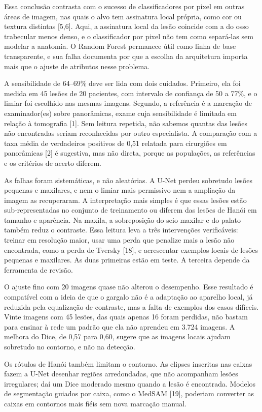 \documentclass[twocolumn]{article}
\begin{document}
Essa conclusão contrasta com o sucesso de classificadores por pixel em outras áreas de imagem, nas quais o alvo tem assinatura local própria, como cor ou textura distintas [5,6]. Aqui, a assinatura local da lesão coincide com a do osso trabecular menos denso, e o classificador por pixel não tem como separá-las sem modelar a anatomia. O Random Forest permanece útil como linha de base transparente, e sua falha documenta por que a escolha da arquitetura importa mais que o ajuste de atributos nesse problema.

A sensibilidade de 64--69\% deve ser lida com dois cuidados. Primeiro, ela foi medida em 45 lesões de 20 pacientes, com intervalo de confiança de 50 a 77\%, e o limiar foi escolhido nas mesmas imagens. Segundo, a referência é a marcação de  examinador(es) sobre panorâmicas, exame cuja sensibilidade é limitada em relação à tomografia [1]. Sem leitura repetida, não sabemos quantas das lesões não encontradas seriam reconhecidas por outro especialista. A comparação com a taxa média de verdadeiros positivos de 0,51 relatada para cirurgiões em panorâmicas [2] é sugestiva, mas não direta, porque as populações, as referências e os critérios de acerto diferem.

As falhas foram sistemáticas, e não aleatórias. A U-Net perdeu sobretudo lesões pequenas e maxilares, e nem o limiar mais permissivo nem a ampliação da imagem as recuperaram. A interpretação mais simples é que essas lesões estão sub-representadas no conjunto de treinamento ou diferem das lesões de Hanói em tamanho e aparência. Na maxila, a sobreposição do seio maxilar e do palato também reduz o contraste. Essa leitura leva a três intervenções verificáveis: treinar em resolução maior, usar uma perda que penalize mais a lesão não encontrada, como a perda de Tversky [18], e acrescentar exemplos locais de lesões pequenas e maxilares. As duas primeiras estão em teste. A terceira depende da ferramenta de revisão.

O ajuste fino com 20 imagens quase não alterou o desempenho. Esse resultado é compatível com a ideia de que o gargalo não é a adaptação ao aparelho local, já reduzida pela equalização de contraste, mas a falta de exemplos dos casos difíceis. Vinte imagens com 45 lesões, das quais apenas 16 foram perdidas, não bastam para ensinar à rede um padrão que ela não aprendeu em 3.724 imagens. A melhora do Dice, de 0,57 para 0,60, sugere que as imagens locais ajudam sobretudo no contorno, e não na detecção.

Os rótulos de Hanói também limitam o contorno. As elipses inscritas nas caixas fazem a U-Net desenhar regiões arredondadas, que não acompanham lesões irregulares; daí um Dice moderado mesmo quando a lesão é encontrada. Modelos de segmentação guiados por caixa, como o MedSAM [19], poderiam converter as caixas em contornos mais fiéis sem nova marcação manual.
\end{document}
